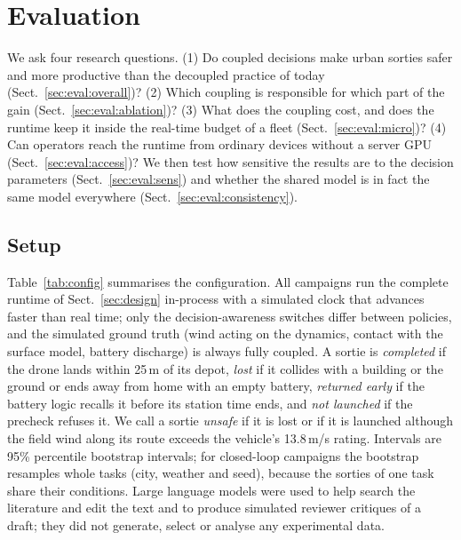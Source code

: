 \section{Evaluation}\label{sec:eval}

We ask four research questions. 
(1) Do coupled decisions make urban sorties safer and more productive than the decoupled practice
of today (Sect.~\ref{sec:eval:overall})? 
(2) Which coupling is responsible for which part of the gain (Sect.~\ref{sec:eval:ablation})? 
(3) What does the coupling cost, and does the runtime keep it inside the real-time budget
of a fleet (Sect.~\ref{sec:eval:micro})? 
(4) Can operators reach the runtime from ordinary devices without a server GPU (Sect.~\ref{sec:eval:access})? 
We then test how sensitive the results are to the decision parameters
(Sect.~\ref{sec:eval:sens}) and whether the shared model is in fact the same model everywhere
(Sect.~\ref{sec:eval:consistency}).

\subsection{Setup}\label{sec:eval:setup}

Table~\ref{tab:config} summarises the configuration. All campaigns run the complete runtime of Sect.~\ref{sec:design}
in-process with a simulated clock that advances faster than real time; only the decision-awareness switches differ
between policies, and the simulated ground truth (wind acting on the dynamics, contact with the surface model, battery
discharge) is always fully coupled. A sortie is \emph{completed} if the drone lands within 25\,m of its depot,
\emph{lost} if it collides with a building or the ground or ends away from home with an empty battery, \emph{returned
early} if the battery logic recalls it before its station time ends, and \emph{not launched} if the precheck refuses
it. We call a sortie \emph{unsafe} if it is lost or if it is launched although the field wind along its route exceeds
the vehicle's 13.8\,m/s rating. Intervals are 95\% percentile bootstrap intervals; for closed-loop campaigns the bootstrap resamples whole
tasks (city, weather and seed), because the sorties of one task share their conditions. Large language models were used
to help search the literature and edit the text and to produce simulated reviewer critiques of a draft; they did not
generate, select or analyse any experimental data.

